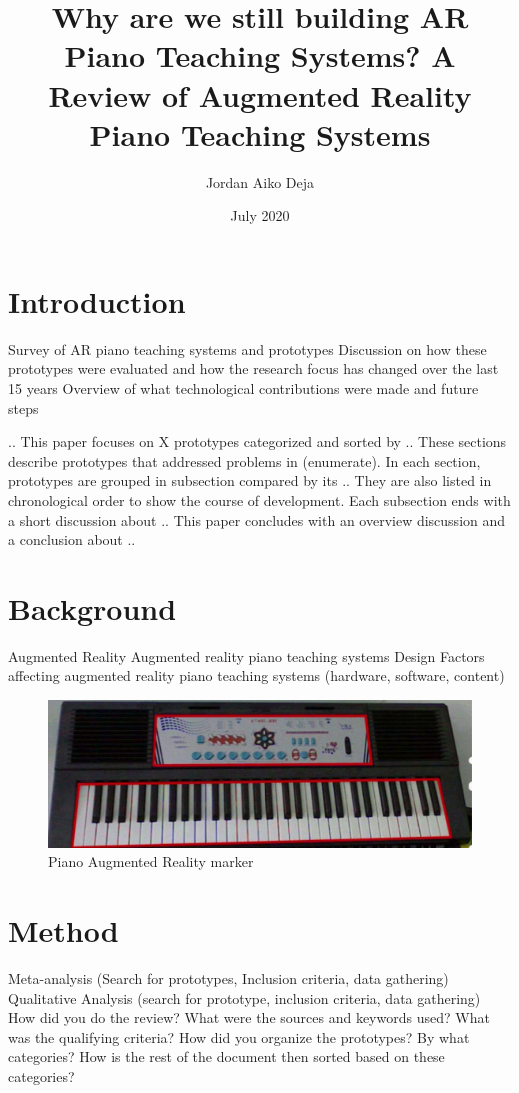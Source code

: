 \documentclass{article}
\title{Why are we still building AR Piano Teaching Systems? A Review of Augmented Reality Piano Teaching Systems}
\author{Jordan Aiko Deja}
\date{July 2020}
\begin{document}
\maketitle


\nocite{*}



\section{Introduction}
Survey of AR piano teaching systems and prototypes
Discussion on how these prototypes were evaluated and how the research focus has changed over the last 15 years
Overview of what technological contributions were made and future steps 

.. This paper focuses on X prototypes categorized and sorted by .. These sections describe prototypes that addressed problems in (enumerate). In each section, prototypes are grouped in subsection compared by its .. They are also listed in chronological order to show the course of development. Each subsection ends with a short discussion about .. This paper concludes with an overview discussion and a conclusion about ..


\section{Background}
Augmented Reality
Augmented reality piano teaching systems
Design Factors affecting augmented reality piano teaching systems (hardware, software, content)



\begin{figure}
    \centering
    \includegraphics[width=15cm]{figures/pianomarker.png}
    \caption{Piano Augmented Reality marker}
    \label{fig:pianomarker}
\end{figure}



\section{Method}
Meta-analysis (Search for prototypes, Inclusion criteria, data gathering)
Qualitative Analysis (search for prototype, inclusion criteria, data gathering)
How did you do the review? What were the sources and keywords used? What was the qualifying criteria? 
How did you organize the prototypes? By what categories? How is the rest of the document then sorted based on these categories? 
\end{document}
